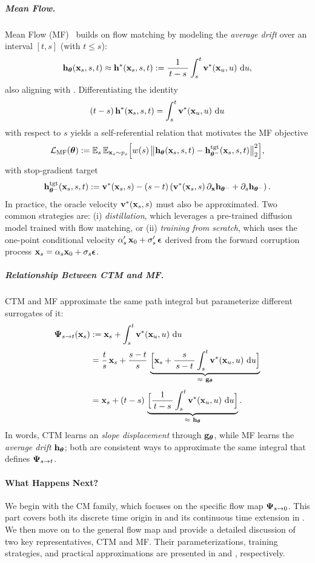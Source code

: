 \subparagraph{Mean Flow.}
Mean Flow (MF)~\citep{geng2025mean} builds on flow matching by modeling the \emph{average drift} over an interval $[t,s]$ (with $t\le s$):
\[
{\mathbf{h}}_{{\bm{\theta}}}({\mathbf{x}}_s,s,t)
 \approx 
{\mathbf{h}}^*({\mathbf{x}}_s,s,t)
:= \frac{1}{\,t-s\,}\int_s^t {\mathbf{v}}^*({\mathbf{x}}_u,u)\,\mathop{}\!\mathrm{d} u,
\]
also aligning with .
Differentiating the identity
\[
(t-s)\,{\mathbf{h}}^*({\mathbf{x}}_s,s,t)  =  \int_s^t {\mathbf{v}}^*({\mathbf{x}}_u,u)\,\mathop{}\!\mathrm{d} u
\]
with respect to $s$ yields a self-referential relation that motivates the MF objective
\[
\mathcal{L}_{\mathrm{MF}}({\bm{\theta}})
:= \mathbb{E}_s\,\mathbb{E}_{{\mathbf{x}}_s\sim p_s} \Big[w(s)\,\big\|
{\mathbf{h}}_{{\bm{\theta}}}({\mathbf{x}}_s,s,t)-{\mathbf{h}}_{{\bm{\theta}}^-}^{\mathrm{tgt}}({\mathbf{x}}_s,s,t)
\big\|_2^2\Big],
\]
with stop-gradient target
\[
{\mathbf{h}}_{{\bm{\theta}}^-}^{\mathrm{tgt}}({\mathbf{x}}_s,s,t)
:= {\mathbf{v}}^*({\mathbf{x}}_s,s)  -  (s-t) \left({\mathbf{v}}^*({\mathbf{x}}_s,s)\,\partial_{\mathbf{x}} {\mathbf{h}}_{{\bm{\theta}}^-} + \partial_s {\mathbf{h}}_{{\bm{\theta}}^-}\right).
\]
In practice, the oracle velocity ${\mathbf{v}}^*({\mathbf{x}}_s,s)$ must also be approximated.
Two common strategies are: (i) \emph{distillation}, which leverages a
pre-trained diffusion model trained with flow matching, or (ii) \emph{training
from scratch}, which uses the one-point conditional velocity
$\alpha'_s\,{\mathbf{x}}_0+\sigma'_s\,{\bm{\epsilon}}$ derived from the forward corruption process
${\mathbf{x}}_s = \alpha_s {\mathbf{x}}_0+\sigma_s {\bm{\epsilon}}$.



\subparagraph{Relationship Between CTM and MF.}
CTM and MF approximate the same path integral but parameterize different surrogates of it:
\begin{align*}
{\bm{\Psi}}_{s\to t}({\mathbf{x}}_s)
&:= {\mathbf{x}}_s  +  \int_s^t {\mathbf{v}}^*({\mathbf{x}}_u,u)\,\mathop{}\!\mathrm{d} u
\\[2pt]
&= \frac{t}{s}\,{\mathbf{x}}_s
 +  \frac{s-t}{s}\,
\underbrace{\Big[{\mathbf{x}}_s + \frac{s}{\,s-t\,} \int_s^t {\mathbf{v}}^*({\mathbf{x}}_u,u)\,\mathop{}\!\mathrm{d} u\Big]}_{\approx~{\mathbf{g}}_{{\bm{\theta}}} }
\\[4pt]
&= {\mathbf{x}}_s  +  (t-s)\,
\underbrace{\Big[\frac{1}{\,t-s\,} \int_s^t {\mathbf{v}}^*({\mathbf{x}}_u,u)\,\mathop{}\!\mathrm{d} u\Big]}_{\approx~{\mathbf{h}}_{{\bm{\theta}}} }.
\end{align*}
In words, CTM learns an \emph{slope displacement} through ${\mathbf{g}}_{\bm{\theta}}$, while MF learns the \emph{average drift} ${\mathbf{h}}_{\bm{\theta}}$; both are consistent ways to approximate the same integral that defines ${\bm{\Psi}}_{s\to t}$.


\paragraph{What Happens Next?}
We begin with the CM family, which focuses on the specific flow map
${\bm{\Psi}}_{s\to 0}$. This part covers both its discrete time origin in
 and its continuous time extension in
. We then move on to the general flow map and provide a
detailed discussion of two key representatives, CTM and MF. Their
parameterizations, training strategies, and practical approximations are
presented in  and , respectively.

